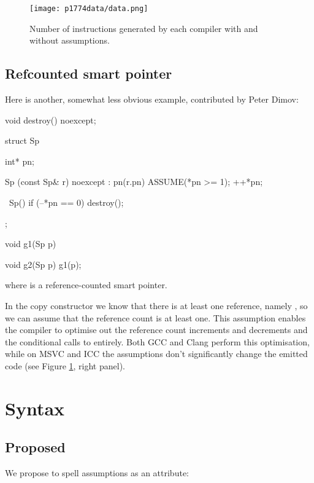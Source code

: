 \begin{figure}[!htbp]
  \texttt{[image: p1774data/data.png]}
  \caption{Number of instructions generated by each compiler with and without assumptions.}
  \label{fig:codesize}
\end{figure}

\subsection{Refcounted smart pointer}

Here is another, somewhat less obvious example, contributed by Peter Dimov:

\begin{codeblock}
void destroy() noexcept;

struct Sp {
  int* pn;

  Sp (const Sp& r) noexcept : pn(r.pn) {
    ASSUME(*pn >= 1);
    ++*pn;
  }

  ~Sp() {
    if (--*pn == 0) 
    destroy();
  }
};

void g1(Sp p) {}

void g2(Sp p) {
  g1(p);
}
\end{codeblock}

where  is a reference-counted smart pointer.

In the copy constructor we
know that there is at least one reference, namely , so we can assume that
the reference count is at least one. This assumption enables the compiler to optimise out
the reference count increments and decrements and the conditional calls to
 entirely. Both GCC and Clang perform this optimisation, while on MSVC and ICC the assumptions don't significantly change the emitted code (see Figure \ref{fig:codesize}, right panel).




\section{Syntax}
\label{sec:syntax}

\subsection{Proposed}

We propose to spell assumptions as an attribute:

\forceindent
{}

